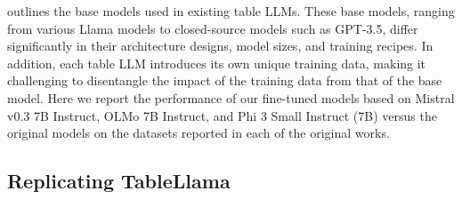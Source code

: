 \documentclass[11pt]{article}
\begin{document}
 outlines the base models used in existing table LLMs. 
These base models, ranging from various Llama models to closed-source models such as GPT-3.5, differ significantly in their architecture designs, model sizes, and training recipes.
In addition, each table LLM introduces its own unique training data, making it challenging to disentangle the impact of the training data from that of the base model.
Here we report the performance of our fine-tuned models based on Mistral v0.3 7B Instruct, OLMo 7B Instruct, and Phi 3 Small Instruct (7B) versus the original models on the datasets reported in each of the original works.

\subsection{Replicating TableLlama}
\label{subsec: reimpl-tablellama}
\end{document}
